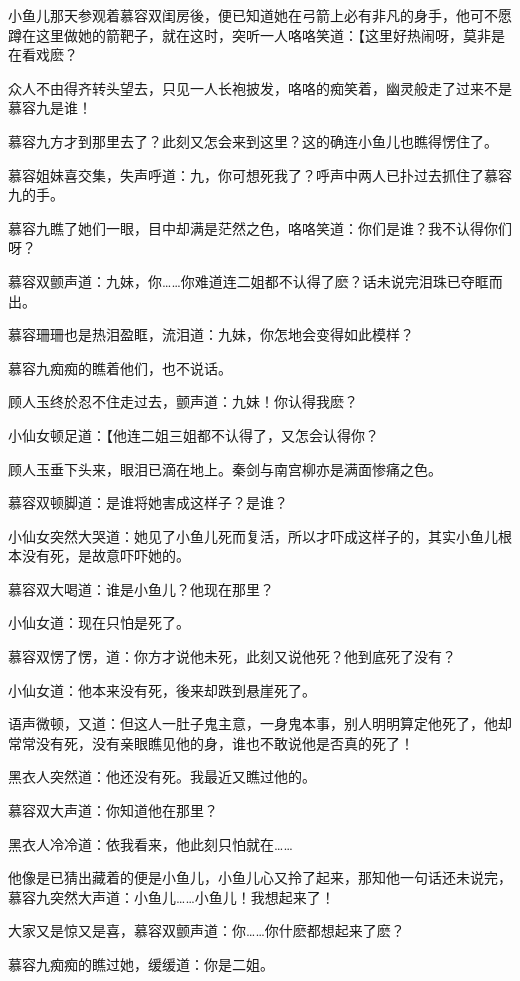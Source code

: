 \documentclass[12pt,oneside]{book}
\begin{document}
小鱼儿那天参观着慕容双闺房後，便已知道她在弓箭上必有非凡的身手，他可不愿蹲在这里做她的箭靶子，就在这时，突听一人咯咯笑道：【这里好热闹呀，莫非是在看戏麽？

众人不由得齐转头望去，只见一人长袍披发，咯咯的痴笑着，幽灵般走了过来不是慕容九是谁！

慕容九方才到那里去了？此刻又怎会来到这里？这的确连小鱼儿也瞧得愣住了。

慕容姐妹喜交集，失声呼道：九，你可想死我了？呼声中两人已扑过去抓住了慕容九的手。

慕容九瞧了她们一眼，目中却满是茫然之色，咯咯笑道：你们是谁？我不认得你们呀？

慕容双颤声道：九妹，你\ldots\ldots 你难道连二姐都不认得了麽？话未说完泪珠已夺眶而出。

慕容珊珊也是热泪盈眶，流泪道：九妹，你怎地会变得如此模样？

慕容九痴痴的瞧着他们，也不说话。

顾人玉终於忍不住走过去，颤声道：九妹！你认得我麽？

小仙女顿足道：【他连二姐三姐都不认得了，又怎会认得你？

顾人玉垂下头来，眼泪已滴在地上。秦剑与南宫柳亦是满面惨痛之色。

慕容双顿脚道：是谁将她害成这样子？是谁？

小仙女突然大哭道：她见了小鱼儿死而复活，所以才吓成这样子的，其实小鱼儿根本没有死，是故意吓吓她的。

慕容双大喝道：谁是小鱼儿？他现在那里？

小仙女道：现在只怕是死了。

慕容双愣了愣，道：你方才说他未死，此刻又说他死？他到底死了没有？

小仙女道：他本来没有死，後来却跌到悬崖死了。

语声微顿，又道：但这人一肚子鬼主意，一身鬼本事，别人明明算定他死了，他却常常没有死，没有亲眼瞧见他的身，谁也不敢说他是否真的死了！

黑衣人突然道：他还没有死。我最近又瞧过他的。

慕容双大声道：你知道他在那里？

黑衣人冷冷道：依我看来，他此刻只怕就在\ldots\ldots{}

他像是已猜出藏着的便是小鱼儿，小鱼儿心又拎了起来，那知他一句话还未说完，慕容九突然大声道：小鱼儿\ldots\ldots 小鱼儿！我想起来了！

大家又是惊又是喜，慕容双颤声道：你\ldots\ldots 你什麽都想起来了麽？

慕容九痴痴的瞧过她，缓缓道：你是二姐。
\end{document}

